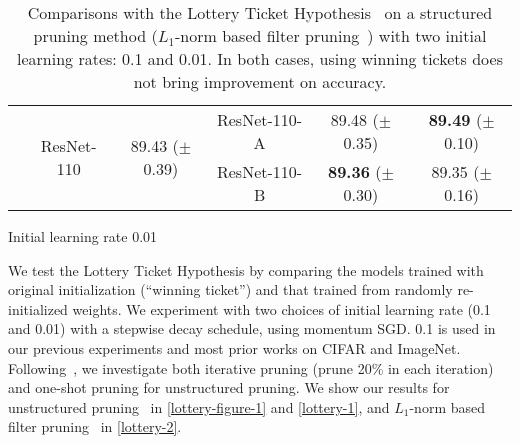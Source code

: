 \begin{table}[!htbp]
\begin{subtable}[b]{\textwidth}
\begin{tabular}{c|ccccc}
                          & \multirow{2}{*}{ResNet-110} & \multirow{2}{*}{89.43 ($\pm$0.39)} & ResNet-110-A & 89.48 ($\pm$0.35)  & \textbf{89.49} ($\pm$0.10) \\
                          &                             &                              & ResNet-110-B & \textbf{89.36} ($\pm$0.30)  & 89.35 ($\pm$0.16) \\ \hline
\end{tabular}
\caption{Initial learning rate 0.01}
\end{subtable}
\caption{Comparisons with the Lottery Ticket Hypothesis~\cite{lottery} on a structured pruning method ($L_1$-norm based filter pruning~\cite{li2016pruning}) with two initial learning rates: 0.1 and 0.01. In both cases, using winning tickets does not bring improvement on accuracy.}
\label{lottery-2}
\end{table}

We test the Lottery Ticket Hypothesis by comparing the models trained with original initialization (``winning ticket'') and that trained from randomly re-initialized weights. We experiment with two choices of initial learning rate (0.1 and 0.01) with a stepwise decay schedule, using momentum SGD. 0.1 is used in our previous experiments and most prior works on CIFAR and ImageNet. Following~\cite{lottery}, we investigate both iterative pruning (prune 20\% in each iteration) and one-shot pruning for unstructured pruning. We show our results for unstructured  pruning~\cite{han2015learning} in \autoref{lottery-figure-1} and \autoref{lottery-1}, and $L_1$-norm based filter pruning~\cite{li2016pruning}  in \autoref{lottery-2}.



